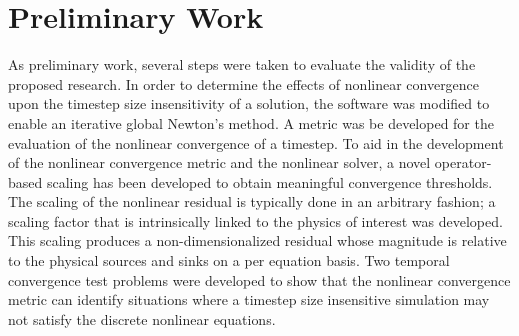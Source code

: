 \chapter{Preliminary Work}
\label{chap:prelim_work}
As preliminary work, several steps were taken to evaluate the validity of the proposed research.
In order to determine the effects of nonlinear convergence upon the timestep size insensitivity of a solution, the \cobra{} software was modified to enable an iterative global Newton's method.
A metric was be developed for the evaluation of the nonlinear convergence of a timestep.
To aid in the development of the nonlinear convergence metric and the nonlinear solver, a novel operator-based scaling has been developed to obtain meaningful convergence thresholds.
The scaling of the nonlinear residual is typically done in an arbitrary fashion; a scaling factor that is intrinsically linked to the physics of interest was developed.
This scaling produces a non-dimensionalized residual whose magnitude is relative to the physical sources and sinks on a per equation basis. 
Two temporal convergence test problems were developed to show that the nonlinear convergence metric can identify situations where a timestep size insensitive simulation may not satisfy the discrete nonlinear equations.
